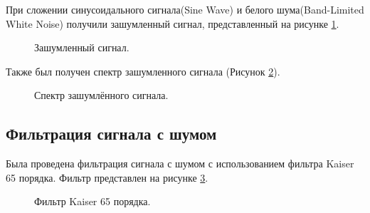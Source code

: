 \documentclass[a4paper,14pt]{extarticle}
\begin{document}
При сложении синусоидального сигнала(Sine Wave) и белого шума(Band-Limited White Noise) получили зашумленный сигнал, представленный на рисунке \ref{002}.

\begin{figure}[H]
\caption{Зашумленный сигнал.}
\label{002}
\end{figure}

Также был получен спектр зашумленного сигнала (Рисунок \ref{003}).

\begin{figure}[H]
\caption{Спектр зашумлённого сигнала.}
\label{003}
\end{figure}


\subsection{Фильтрация сигнала с шумом}

Была проведена фильтрация сигнала с шумом с использованием фильтра Kaiser 65 порядка. Фильтр представлен на рисунке \ref{004}. 

\begin{figure}[H]
\caption{Фильтр Kaiser 65 порядка.}
\label{004}
\end{figure}
\end{document}
